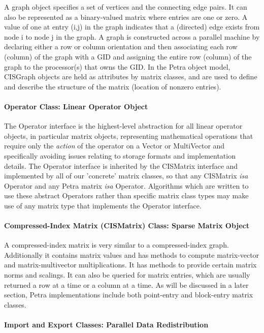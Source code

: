 \documentclass[10pt,relax]{PetraObjectModel}
\begin{document}
A graph object specifies a set of vertices and the connecting edge
pairs.  It can also be represented as a binary-valued matrix where
entries are one or zero.  A value of one at entry (i,j) in the graph
indicates that a (directed) edge exists from node i to node j in the
graph.  A graph is constructed across a parallel machine by
declaring either a row or column orientation and then associating
each row (column) of the graph with a GID and assigning the entire
row (column) of the graph to the processor(s) that owns the GID. In
the Petra object model, CISGraph objects are held as attributes by
matrix classes, and are used to define and describe the structure of
the matrix (location of nonzero entries).

\paragraph{Operator Class: Linear Operator Object}

The Operator interface is the highest-level abstraction for all
linear operator objects, in particular matrix objects, representing
mathematical operations that require only the \textit{action} of the
operator on a Vector or MultiVector and specifically avoiding issues
relating to storage formats and implementation details. The Operator
interface is inherited by the CISMatrix interface and implemented by
all of our 'concrete' matrix classes, so that any CISMatrix
\textit{isa} Operator and any Petra matrix \textit{isa} Operator.
Algorithms which are written to use these abstract Operators rather
than specific matrix class types may make use of any matrix type
that implements the Operator interface.

\paragraph{Compressed-Index Matrix (CISMatrix) Class: Sparse Matrix Object}

A compressed-index matrix is very similar to a compressed-index
graph. Additionally it contains matrix values and has methods to
compute matrix-vector and matrix-multivector multiplications.  It
has methods to provide certain matrix norms and scalings.  It can
also be queried for matrix entries, which are usually returned a row
at a time or a column at a time. As will be discussed in a later
section, Petra implementations include both point-entry and
block-entry matrix classes.


\paragraph{Import and Export Classes:  Parallel Data Redistribution}
\end{document}
